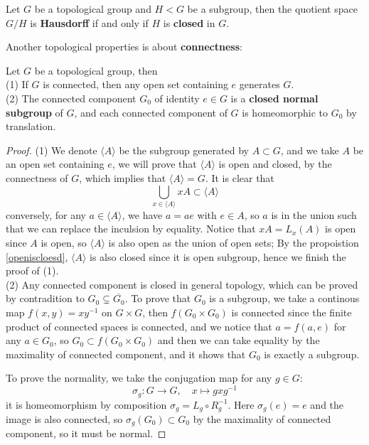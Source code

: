 \begin{corollary}
    Let \(G\) be a topological group and \(H < G\) be a subgroup, then the quotient space \(G/H\) is \textbf{Hausdorff} if and only if \(H\) is \textbf{closed} in \(G\).
\end{corollary}

Another topological properties is about \textbf{connectness}:
\begin{colorproposition}
    Let \(G\) be a topological group, then \\

    (1) If \(G\) is connected, then any open set containing \(e\) generates \(G\).\\

    (2) The connected component \(G_0\) of identity \(e \in G\) is a \textbf{closed normal subgroup} of \(G\), and each connected component of \(G\) is homeomorphic to \(G_0\) by translation.
\end{colorproposition}

\begin{proof}
    (1) We denote \(\langle A \rangle\) be the subgroup generated by \(A \subset G\), and we take \(A\) be an open set containing \(e\), we will prove that \(\langle A \rangle\) is open and closed, by the connectness of \(G\), which implies that \(\langle A \rangle = G\). It is clear that
    \[\bigcup_{x \in \langle A \rangle} xA \subset \langle A \rangle\]
    conversely, for any \(a \in \langle A \rangle\), we have \(a = ae\) with \(e \in A\), so \(a\) is in the union such that we can replace the inculsion by equality. Notice that \(xA = L_x(A)\) is open since \(A\) is open, so \(\langle A \rangle\) is also open as the union of open sets; By the propoistion \ref{openiscloesd}, \(\langle A \rangle\) is also closed since it is open subgroup, hence we finish the proof of (1).\\

    (2) Any connected component is closed in general topology, which can be proved by contradition to \(G_0 \subsetneq \overline{G_0}\). To prove that \(G_0\) is a subgroup, we take a continous map \(f(x,y) = xy^{-1}\) on \(G \times G\), then \(f(G_0 \times G_0)\) is connected since the finite product of connected spaces is connected, and we notice that \(a = f(a,e)\) for any \(a \in G_0\), so \(G_0 \subset f(G_0 \times G_0)\) and then we can take equality by the maximality of connected component, and it shows that \(G_0\) is exactly a subgroup. 

    To prove the normality, we take the conjugation map for any \(g \in G\):
    \[\sigma_g: G \to G, \quad x \mapsto gxg^{-1}\]
    it is homeomorphism by composition \(\sigma_g = L_g \circ R_g^{-1}\). Here \(\sigma_g(e) = e\) and the image is also connected, so \(\sigma_g(G_0) \subset G_0\) by the maximality of connected component, so it must be normal.
\end{proof}

